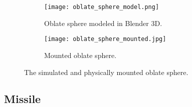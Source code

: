 \begin{figure}[htbp]
\centering
\begin{subfigure}{.5\textwidth}
  \centering
  \texttt{[image: oblate\_sphere\_model.png]}
  \caption{Oblate sphere modeled in Blender 3D.}
  \label{fig:os_model}
\end{subfigure}%
\begin{subfigure}{.5\textwidth}
  \centering
  \texttt{[image: oblate\_sphere\_mounted.jpg]}
  \caption{Mounted oblate sphere.}
  \label{fig:os_mount}
\end{subfigure}
\caption{The simulated and physically mounted oblate sphere.}
\label{fig:os}
\end{figure}

\subsection{Missile}
